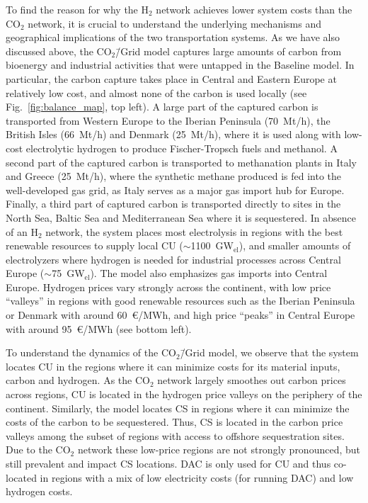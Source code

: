 \documentclass[twocolumn]{article}
\newcommand{\COtwo}{CO$_2$}
\newcommand{\Htwo}{H$_2$}
\newcommand{\modBase}{Baseline model}
\newcommand{\modCO}{CO$_2$\=/Grid model}
\begin{document}
To find the reason for why the \Htwo{} network achieves lower system costs than the \COtwo{} network, it is crucial to understand the underlying mechanisms and geographical implications of the two transportation systems.
As we have also discussed above, the \modCO{} captures large amounts of carbon from bioenergy and industrial activities that were untapped in the \modBase{}. In particular, the carbon capture takes place in Central and Eastern Europe at relatively low cost, and almost none of the carbon is used locally (see Fig.~\ref{fig:balance_map}, top left). A large part of the captured carbon is transported from Western Europe to the Iberian Peninsula (70~Mt/h), the British Isles (66~Mt/h) and Denmark (25~Mt/h), where it is used along with low-cost electrolytic hydrogen to produce Fischer-Tropsch fuels and methanol. A second part of the captured carbon is transported to methanation plants in Italy and Greece (25~Mt/h), where the synthetic methane produced is fed into the well-developed gas grid, as Italy serves as a major gas import hub for Europe. Finally, a third part of captured carbon is transported directly to sites in the North Sea, Baltic Sea and Mediterranean Sea where it is sequestered. In absence of an \Htwo{} network, the system places most electrolysis in regions with the best renewable resources to supply local CU ($\sim$1100~GW$_\text{el}$), and smaller amounts of electrolyzers where hydrogen is needed for industrial processes across Central Europe ($\sim$75~GW$_\text{el}$). The model also emphasizes gas imports into Central Europe. Hydrogen prices vary strongly across the continent, with low price ``valleys'' in regions with good renewable resources such as the Iberian Peninsula or Denmark with around 60~€/MWh, and high price ``peaks'' in Central Europe with around 95~€/MWh (see bottom left).

To understand the dynamics of the \modCO{}, we observe that the system locates CU in the regions where it can minimize costs for its material inputs, carbon and hydrogen. As the \COtwo{} network largely smoothes out carbon prices across regions, CU is located in the hydrogen price valleys on the periphery of the continent. Similarly, the model locates CS in regions where it can minimize the costs of the carbon to be sequestered. Thus, CS is located in the carbon price valleys among the subset of regions with access to offshore sequestration sites. Due to the \COtwo{} network these low-price regions are not strongly pronounced, but still prevalent and impact CS locations. DAC is only used for CU and thus co-located in regions with a mix of low electricity costs (for running DAC) and low hydrogen costs.
\end{document}
